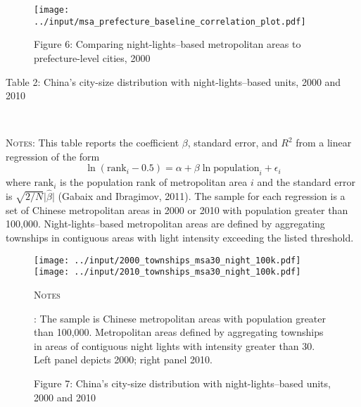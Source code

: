 \documentclass[11pt]{article}
\begin{document}
\begin{figure}
\caption*{Figure 6: Comparing night-lights--based metropolitan areas to prefecture-level
cities, 2000\label{fig:Comparing-township-prefecturelevel}}
\begin{centering}
\texttt{[image: ../input/msa\_prefecture\_baseline\_correlation\_plot.pdf]}
\par\end{centering}
\end{figure}


\begin{table}
\caption*{Table 2: China's city-size distribution with night-lights--based units, 2000
and 2010}
\label{tab:China-zipf-2000-2010}
\begin{center}
 \\
\begin{minipage}[t]{0.9\textwidth}%
{\footnotesize \textsc{Notes}:
This table reports the coefficient $\beta$, standard error, and $R^{2}$ from a linear regression of the form
\begin{equation*}
\ln (\text{rank}_i-0.5) = \alpha + \beta \ln \text{population}_i + \epsilon_i
\end{equation*}
where $\text{rank}_i$ is the population rank of metropolitan area $i$
and the standard error is $\sqrt{2/N}\vert\hat{\beta}\vert$ (Gabaix and Ibragimov, 2011).
The sample for each regression is a set of Chinese metropolitan areas in 2000 or 2010
with population greater than 100,000.
Night-lights--based metropolitan areas are defined by aggregating townships in contiguous areas with light intensity exceeding the listed threshold.\par
}
\end{minipage}
\end{center}
\end{table}



\begin{figure}
\caption*{Figure 7: China's city-size distribution with night-lights--based units, 2000
and 2010\label{fig:China-zipf-2000-2010}}
\begin{centering}
\texttt{[image: ../input/2000\_townships\_msa30\_night\_100k.pdf]}\texttt{[image: ../input/2010\_townships\_msa30\_night\_100k.pdf]}
\par\end{centering}
\centering{}%
\begin{minipage}[t]{0.85\textwidth}%
\textsc{\footnotesize{}Notes}{\footnotesize{}: The sample is Chinese metropolitan
areas with population greater than 100,000. Metropolitan areas defined
by aggregating townships in areas of contiguous night lights with intensity
greater than 30. Left panel depicts 2000; right panel 2010.\par}%
\end{minipage}
\end{figure}
\end{document}
